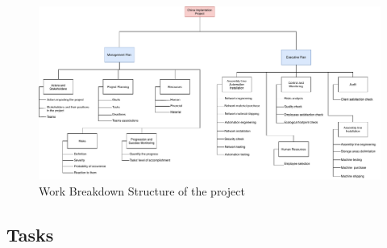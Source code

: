 \begin{figure}[h]

\centering
\includegraphics[scale=0.5]{Img/wbs-management-inter.pdf}
\caption{Work Breakdown Structure of the project}

\end{figure}

\subsection{Tasks}

